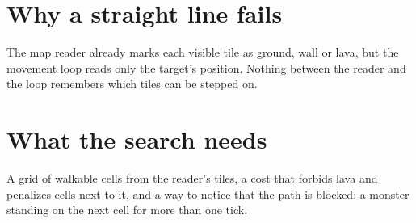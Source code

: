 \section{Why a straight line fails}
The map reader already marks each visible tile as ground, wall or lava, but the movement loop reads only the target's position. Nothing between the reader and the loop remembers which tiles can be stepped on.

\section{What the search needs}
A grid of walkable cells from the reader's tiles, a cost that forbids lava and penalizes cells next to it, and a way to notice that the path is blocked: a monster standing on the next cell for more than one tick.
